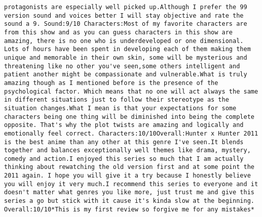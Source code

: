 \documentclass[
]{article}
\begin{document}
\begin{verbatim}
protagonists are especially well picked up.Although I prefer the 99 version sound and voices better I will stay objective and rate the sound a 9. Sound:9/10 Characters:Most of my favorite characters are from this show and as you can guess characters in this show are amazing, there is no one who is underdeveloped or one dimensional. Lots of hours have been spent in developing each of them making them unique and memorable in their own skin, some will be mysterious and threatening like no other you've seen,some others intelligent and patient another might be compassionate and vulnerable.What is truly amazing though as I mentioned before is the presence of the psychological factor. Which means that no one will act always the same in different situations just to follow their stereotype as the situation changes.What I mean is that your expectations for some characters being one thing will be diminished into being the complete opposite. That's why the plot twists are amazing and logically and emotionally feel correct. Characters:10/10Overall:Hunter x Hunter 2011 is the best anime than any other at this genre I've seen.It blends together and balances exceptionally well themes like drama, mystery, comedy and action.I enjoyed this series so much that I am actually thinking about rewatching the old version first and at some point the 2011 again. I hope you will give it a try because I honestly believe you will enjoy it very much.I recommend this series to everyone and it doesn't matter what genres you like more, just trust me and give this series a go but stick with it cause it's kinda slow at the beginning. Overall:10/10*This is my first review so forgive me for any mistakes*

\end{verbatim}
\end{document}
